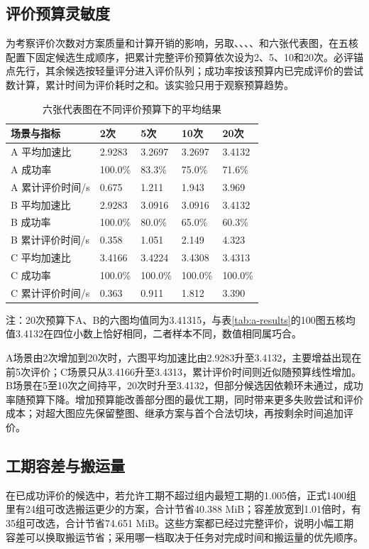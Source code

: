 \subsection{评价预算灵敏度}
为考察评价次数对方案质量和计算开销的影响，另取、、、、和六张代表图，在五核配置下固定候选生成顺序，把累计完整评价预算依次设为2、5、10和20次。必评锚点先行，其余候选按轻量评分进入评价队列；成功率按该预算内已完成评价的尝试数计算，累计时间为评价耗时之和。该实验只用于观察预算趋势。
\begin{table}[H]\centering\scriptsize
\caption{六张代表图在不同评价预算下的平均结果}
\label{tab:budget-sensitivity}
\begin{tabularx}{\linewidth}{lYYYY}
\toprule
场景与指标 & 2次 & 5次 & 10次 & 20次\\\midrule
A 平均加速比 & 2.9283 & 3.2697 & 3.2697 & 3.4132\\
A 成功率 & 100.0\% & 83.3\% & 75.0\% & 71.6\%\\
A 累计评价时间/s & 0.675 & 1.211 & 1.943 & 3.969\\
B 平均加速比 & 2.9283 & 3.0916 & 3.0916 & 3.4132\\
B 成功率 & 100.0\% & 80.0\% & 65.0\% & 60.3\%\\
B 累计评价时间/s & 0.358 & 1.051 & 2.149 & 4.323\\
C 平均加速比 & 3.4166 & 3.4224 & 3.4308 & 3.4313\\
C 成功率 & 100.0\% & 100.0\% & 100.0\% & 100.0\%\\
C 累计评价时间/s & 0.363 & 0.911 & 1.812 & 3.390\\
\bottomrule
\end{tabularx}
\end{table}
注：20次预算下A、B的六图均值同为3.41315，与表\ref{tab:a-results}的100图五核均值3.4132在四位小数上恰好相同，二者样本不同，数值相同属巧合。

A场景由2次增加到20次时，六图平均加速比由2.9283升至3.4132，主要增益出现在前5次评价；C场景只从3.4166升至3.4313，累计评价时间则近似随预算线性增加。B场景在5至10次之间持平，20次时升至3.4132，但部分候选因依赖环未通过，成功率随预算下降。增加预算能改善部分图的最优工期，同时带来更多失败尝试和评价成本；对超大图应先保留整图、继承方案与首个合法切块，再按剩余时间追加评价。

\subsection{工期容差与搬运量}
在已成功评价的候选中，若允许工期不超过组内最短工期的1.005倍，正式1400组里有24组可改选搬运更少的方案，合计节省40.388 MiB；容差放宽到1.01倍时，有35组可改选，合计节省74.651 MiB。这些方案都已经过完整评价，说明小幅工期容差可以换取搬运节省；采用哪一档取决于任务对完成时间和搬运量的优先顺序。
